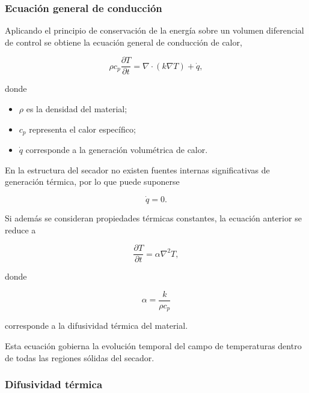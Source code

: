 \subsubsection{Ecuación general de conducción}

Aplicando el principio de conservación de la energía sobre un volumen diferencial de control se obtiene la ecuación general de conducción de calor,

\begin{equation}
\label{eqn:heattransfer}
\rho c_p
\frac{\partial T}{\partial t}
=
\nabla\cdot(k\nabla T)
+
\dot q,
\end{equation}

donde

\begin{itemize}

\item $\rho$ es la densidad del material;

\item $c_p$ representa el calor específico;

\item $\dot q$ corresponde a la generación volumétrica de calor.

\end{itemize}

En la estructura del secador no existen fuentes internas significativas de generación térmica, por lo que puede suponerse

\[
\dot q=0.
\]

Si además se consideran propiedades térmicas constantes, la ecuación anterior se reduce a

\begin{equation}
\label{eqn:transferenciacalor}
\frac{\partial T}{\partial t}
=
\alpha
\nabla^2T,
\end{equation}

donde

\begin{equation}
\alpha=
\frac{k}{\rho c_p}
\end{equation}

corresponde a la difusividad térmica del material.

Esta ecuación gobierna la evolución temporal del campo de temperaturas dentro de todas las regiones sólidas del secador.

\subsubsection{Difusividad térmica}


